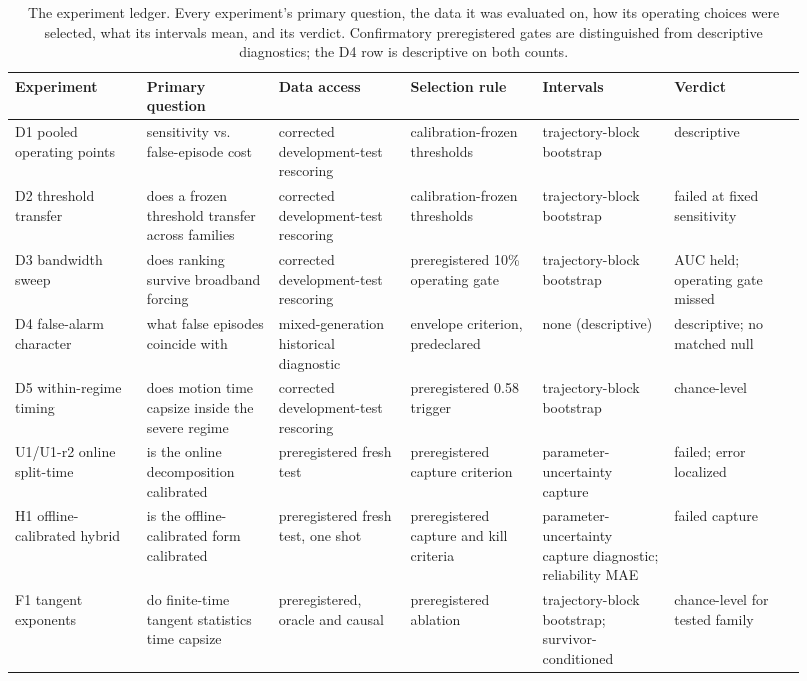 \documentclass[11pt]{article}
\begin{document}
\begin{table}[H]\footnotesize\caption{The experiment ledger. Every experiment's primary question, the data it was evaluated on, how its operating choices were selected, what its intervals mean, and its verdict. Confirmatory preregistered gates are distinguished from descriptive diagnostics; the D4 row is descriptive on both counts.}\begin{tabular}{>{\raggedright\arraybackslash}p{0.153\linewidth}>{\raggedright\arraybackslash}p{0.153\linewidth}>{\raggedright\arraybackslash}p{0.153\linewidth}>{\raggedright\arraybackslash}p{0.153\linewidth}>{\raggedright\arraybackslash}p{0.153\linewidth}>{\raggedright\arraybackslash}p{0.153\linewidth}}\hline
\textbf{Experiment} & \textbf{Primary question} & \textbf{Data access} & \textbf{Selection rule} & \textbf{Intervals} & \textbf{Verdict} \\\hline
D1 pooled operating points & sensitivity vs. false-episode cost & corrected development-test rescoring & calibration-frozen thresholds & trajectory-block bootstrap & descriptive \\
D2 threshold transfer & does a frozen threshold transfer across families & corrected development-test rescoring & calibration-frozen thresholds & trajectory-block bootstrap & failed at fixed sensitivity \\
D3 bandwidth sweep & does ranking survive broadband forcing & corrected development-test rescoring & preregistered 10\% operating gate & trajectory-block bootstrap & AUC held; operating gate missed \\
D4 false-alarm character & what false episodes coincide with & mixed-generation historical diagnostic & envelope criterion, predeclared & none (descriptive) & descriptive; no matched null \\
D5 within-regime timing & does motion time capsize inside the severe regime & corrected development-test rescoring & preregistered 0.58 trigger & trajectory-block bootstrap & chance-level \\
U1/U1-r2 online split-time & is the online decomposition calibrated & preregistered fresh test & preregistered capture criterion & parameter-uncertainty capture & failed; error localized \\
H1 offline-calibrated hybrid & is the offline-calibrated form calibrated & preregistered fresh test, one shot & preregistered capture and kill criteria & parameter-uncertainty capture diagnostic; reliability MAE & failed capture \\
F1 tangent exponents & do finite-time tangent statistics time capsize & preregistered, oracle and causal & preregistered ablation & trajectory-block bootstrap; survivor-conditioned & chance-level for tested family \\

\end{tabular}
\end{table}
\end{document}
